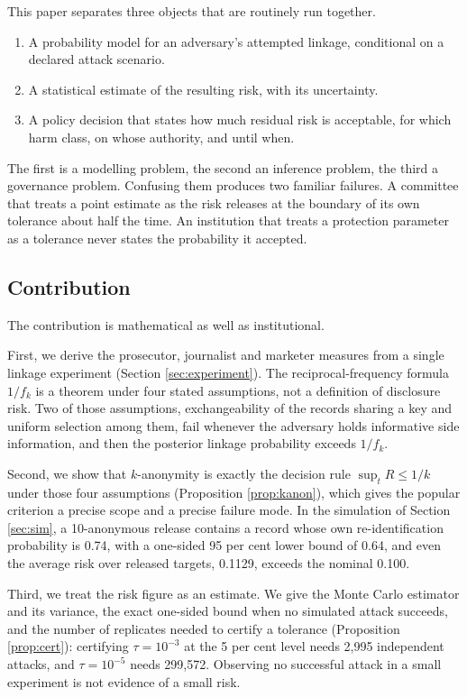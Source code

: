 \documentclass[11pt,a4paper]{article}
\theoremstyle{plain}
\theoremstyle{definition}
\begin{document}
This paper separates three objects that are routinely run together.

\begin{enumerate}
\item A probability model for an adversary's attempted linkage, conditional on
a declared attack scenario.
\item A statistical estimate of the resulting risk, with its uncertainty.
\item A policy decision that states how much residual risk is acceptable, for
which harm class, on whose authority, and until when.
\end{enumerate}

The first is a modelling problem, the second an inference problem, the third a
governance problem. Confusing them produces two familiar failures. A committee
that treats a point estimate as the risk releases at the boundary of its own
tolerance about half the time. An institution that treats a protection
parameter as a tolerance never states the probability it accepted.

\subsection{Contribution}

The contribution is mathematical as well as institutional.

First, we derive the prosecutor, journalist and marketer measures from a single
linkage experiment (Section \ref{sec:experiment}). The reciprocal-frequency
formula $1/f_k$ is a theorem under four stated assumptions, not a definition of
disclosure risk. Two of those assumptions, exchangeability of the records
sharing a key and uniform selection among them, fail whenever the adversary
holds informative side information, and then the posterior linkage probability
exceeds $1/f_k$.

Second, we show that $k$-anonymity is exactly the decision rule
$\sup_t R \leq 1/k$ under those four assumptions (Proposition
\ref{prop:kanon}), which gives the popular criterion a precise scope and a
precise failure mode. In the simulation of Section \ref{sec:sim}, a
10-anonymous release contains a record whose own re-identification probability
is 0.74, with a one-sided 95 per cent lower bound of 0.64, and even the average
risk over released targets, 0.1129, exceeds the nominal 0.100.

Third, we treat the risk figure as an estimate. We give the Monte Carlo
estimator and its variance, the exact one-sided bound when no simulated attack
succeeds, and the number of replicates needed to certify a tolerance
(Proposition \ref{prop:cert}): certifying $\tau = 10^{-3}$ at the 5 per cent
level needs 2,995 independent attacks, and $\tau = 10^{-5}$ needs 299,572.
Observing no successful attack in a small experiment is not evidence of a small
risk.
\end{document}
